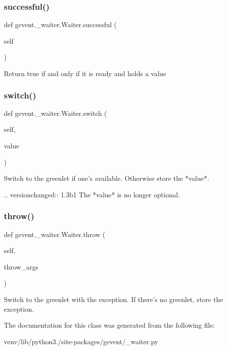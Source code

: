 \subsubsection{\texorpdfstring{successful()}{successful()}}
{\footnotesize\ttfamily def gevent.\+\_\+waiter.\+Waiter.\+successful (\begin{DoxyParamCaption}\item[{}]{self }\end{DoxyParamCaption})}

\begin{DoxyVerb}Return true if and only if it is ready and holds a value\end{DoxyVerb}
 \mbox{\label{classgevent_1_1__waiter_1_1_waiter_ac31aa2cdc2a7aac4cf2d9e4ea5bb526f}} 
\subsubsection{\texorpdfstring{switch()}{switch()}}
{\footnotesize\ttfamily def gevent.\+\_\+waiter.\+Waiter.\+switch (\begin{DoxyParamCaption}\item[{}]{self,  }\item[{}]{value }\end{DoxyParamCaption})}

\begin{DoxyVerb}Switch to the greenlet if one's available. Otherwise store the
*value*.

.. versionchanged:: 1.3b1
   The *value* is no longer optional.
\end{DoxyVerb}
 \mbox{\label{classgevent_1_1__waiter_1_1_waiter_a1d8d060e34ca91799fdd761b5dbea82a}} 
\subsubsection{\texorpdfstring{throw()}{throw()}}
{\footnotesize\ttfamily def gevent.\+\_\+waiter.\+Waiter.\+throw (\begin{DoxyParamCaption}\item[{}]{self,  }\item[{}]{throw\+\_\+args }\end{DoxyParamCaption})}

\begin{DoxyVerb}Switch to the greenlet with the exception. If there's no greenlet, store the exception.\end{DoxyVerb}
 

The documentation for this class was generated from the following file\+:\begin{DoxyCompactItemize}
\item 
venv/lib/python3./site-\/packages/gevent/\+\_\+waiter.\+py\end{DoxyCompactItemize}
